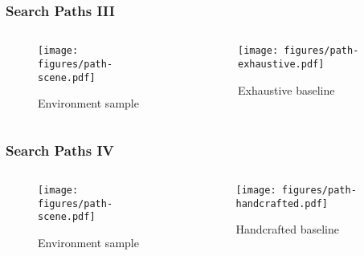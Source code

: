 \begin{frame}[noframenumbering]
    \frametitle{Search Paths III}

    \begin{columns}
        \begin{column}{0.5\textwidth}
            \begin{figure}
                \centering
                \texttt{[image: figures/path-scene.pdf]}
                \par Environment sample
            \end{figure}
        \end{column}
        \begin{column}{0.5\textwidth}
            \begin{figure}
                \centering
                \texttt{[image: figures/path-exhaustive.pdf]}
                \par Exhaustive baseline
            \end{figure}
        \end{column}
    \end{columns}
\end{frame}

\begin{frame}[noframenumbering]
    \frametitle{Search Paths IV}

    \begin{columns}
        \begin{column}{0.5\textwidth}
            \begin{figure}
                \centering
                \texttt{[image: figures/path-scene.pdf]}
                \par Environment sample
            \end{figure}
        \end{column}
        \begin{column}{0.5\textwidth}
            \begin{figure}
                \centering
                \texttt{[image: figures/path-handcrafted.pdf]}
                \par Handcrafted baseline
            \end{figure}
        \end{column}
    \end{columns}
\end{frame}

